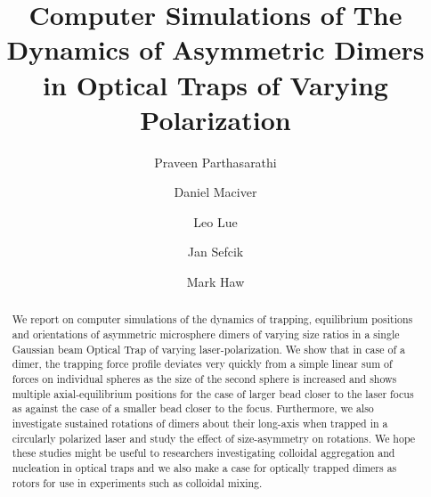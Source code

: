 \documentclass[preprint,  3p]{elsarticle}
\begin{document}
	\begin{frontmatter}
		\title{Computer Simulations of The Dynamics of Asymmetric Dimers in Optical Traps of Varying Polarization}
		
		\author[aff1]{Praveen Parthasarathi}
		
		\author[aff1]{Daniel Maciver}
		
		\author[aff1]{Leo Lue}
		
		\author[aff1]{Jan Sefcik}
		
		\author[aff1]{Mark Haw}
		
		
		\begin{abstract}
			We report on computer simulations of the dynamics of trapping, equilibrium positions and orientations of asymmetric microsphere dimers of varying size ratios in a single Gaussian beam Optical Trap of varying laser-polarization. We show that in case of a dimer, the trapping force profile deviates very quickly from a simple linear sum of forces on individual spheres as the size of the second sphere is increased and shows multiple axial-equilibrium positions for the case of larger bead closer to the laser focus as against the case of a smaller bead closer to the focus. Furthermore, we also investigate sustained rotations of dimers about their long-axis when trapped in a circularly polarized laser and study the effect of size-asymmetry on rotations. We hope these studies might be useful to researchers investigating colloidal aggregation and nucleation in optical traps and we also make a case for optically trapped dimers as rotors for use in experiments such as colloidal mixing.  
		\end{abstract}
		
		

\end{frontmatter}
\end{document}
